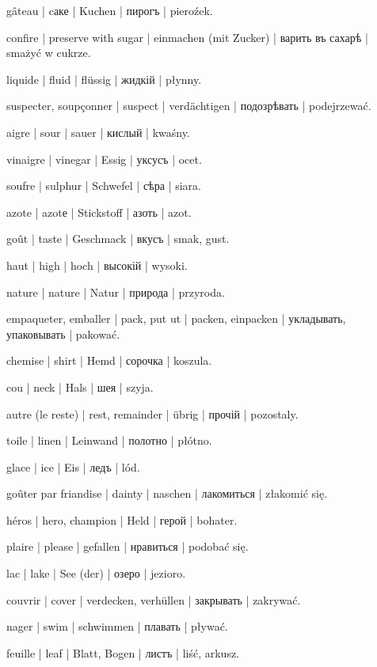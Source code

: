 \begin{ekzvocab}{1em}
 gâteau | cаке | Kuchen | пирогъ | pieroźek.

 confire | preserve with sugar | einmachen (mit Zucker) | варить въ сахарѣ | smażyć w cukrze.

 liquide | fluid | flüssig | жидкій | płynny.

 suspecter, soupçonner | suspect | verdächtigen | подозрѣвать | podejrzewać.

 aigre | sour | sauer | кислый | kwaśny.

 vinaigre | vinegar | Essig | уксусъ | ocet.

 soufre | sulphur | Schwefel | сѣра | siara.

 azote | azotе | Stickstoff | азоть | azot.

 goût | taste | Geschmack | вкусъ | smak, gust.

 haut | high | hoch | высокій | wysoki.

 nature | nature | Natur | природа | przyroda.

 empaqueter, emballer | pack, put ut | packen, einpacken | укладывать, упаковывать | pakować.

 chemise | shirt | Hemd | сорочка | koszula.

 cou | neck | Hals | шея | szyja.

 autre (le reste) | rest, remainder | übrig | прочій | pozostaly.

 toile | linen | Leinwand | полотно | płótno.

 glace | ice | Eis | ледъ | lód.

 goûter par friandise | dainty | naschen | лакомиться | złakomić się.

 héros | hero, champion | Held | герой | bohater.

 plaire | please | gefallen | нравиться | podobać się.

 lac | lake | See (der) | озеро | jezioro.

 couvrir | cover | verdecken, verhüllen | закрывать | zakrywać.

\begin{minipage}{\textwidth}
 nager | swim | schwimmen | плавать | pływać.

 feuille | leaf | Blatt, Bogen | листъ | liść, arkusz.
\end{minipage}
\end{ekzvocab}

